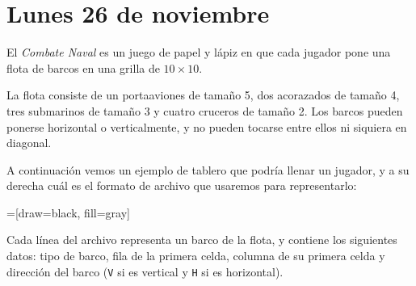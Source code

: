\documentclass[12pt,spanish]{article}
\begin{document}
  \thispagestyle{empty}
  \section*{Lunes 26 de noviembre}

  El \emph{Combate Naval} es un juego de papel y lápiz
  en que cada jugador pone una flota de barcos
  en una grilla de \(10\times 10\).

  La flota consiste de
  un portaaviones de tamaño 5,
  dos acorazados de tamaño 4,
  tres submarinos de tamaño 3
  y cuatro cruceros de tamaño 2.
  Los barcos pueden ponerse horizontal o verticalmente,
  y no pueden tocarse entre ellos ni siquiera en diagonal.

  A continuación vemos un ejemplo de tablero que podría llenar un jugador,
  y a su derecha cuál es el formato de archivo
  que usaremos para representarlo:

  =[draw=black, fill=gray]
  \begin{minipage}[T]{0.45\textwidth}
  \end{minipage}
  \begin{minipage}[T]{0.45\textwidth}
    \vspace{3ex}
    
  \end{minipage}

  Cada línea del archivo representa un barco de la flota,
  y contiene los siguientes datos:
  tipo de barco,
  fila de la primera celda,
  columna de su primera celda
  y dirección del barco (\verb+V+ si es vertical y \verb+H+ si es horizontal).
\end{document}
